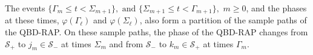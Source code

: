 The events \(\{\Gamma_m\leq t< \Sigma_{m+1}\} , \mbox{ and } \{\Sigma_{m+1}\leq t< \Gamma_{m+1}\}, \) \(m\geq 0\), and the phases at these times, \(\varphi(\Gamma_\ell)\) and \(\varphi(\Sigma_\ell)\), also form a partition of the sample paths of the QBD-RAP. On these sample paths, the phase of the QBD-RAP changes from \(\mathcal S_+\) to \(j_m\in\mathcal S_-\) at times \(\Sigma_{m}\) and from \(\mathcal S_-\) to \(k_m\in\mathcal S_+\) at times \(\Gamma_m\). %


